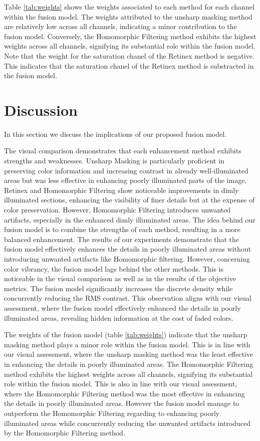 \documentclass[sigconf]{acmart}
\begin{document}
Table \ref{tab:weights} shows the weights associated to each method for each channel within the fusion model. The weights attributed to the unsharp masking method  are relatively low across all channels, indicating a minor contribution to the fusion model. Conversely, the Homomorphic Filtering method exhibits the highest weights across all channels, signifying its substantial role within the fusion model. Note that the  weight for the saturation chanel of the Retinex method is negative. This indicates that the saturation chanel of the Retinex method is substracted in the fusion model. 



\section{Discussion}\label{sec:discussion}
In this section we discuss the implications of our proposed fusion model. 

The visual comparison demonstrates that each enhancement method exhibits strengths and weaknesses. Unsharp Masking is particularly proficient in preserving color information and increasing contrast in already well-illuminated areas but was less effective in enhancing poorly illuminated parts of the image. Retinex and Homomorphic Filtering show noticeable improvements in dimly illuminated sections, enhancing the visibility of finer details but at the expense of color preservation. However, Homomorphic Filtering introduces unwanted artifacts, especially in the enhanced dimly illuminated areas.
The idea behind our fusion model is to combine the strengths of each method, resulting in a more balanced enhancement. The results of our experiments demonstrate that the fusion model effectively enhances the details in poorly illuminated areas without introducing unwanted artifacts like Homomorphic filtering. However, concerning color vibrancy, the fusion model lags behind the other methods. This is noticeable in the visual comparison as well as in the results of the objective metrics. The fusion model significantly increases the discrete density while concurrently reducing the RMS contrast. This observation aligns with our visual assessment, where the fusion model effectively enhanced the details in poorly illuminated areas, revealing hidden information at the cost of faded colors.

The weights of the fusion model (table \ref{tab:weights}) indicate that the unsharp masking method plays a minor role within the fusion model. This is in line with our visual assessment, where the unsharp masking method was the least effective in enhancing the details in poorly illuminated areas. The Homomorphic Filtering method exhibits the highest weights across all channels, signifying its substantial role within the fusion model. This is also in line with our visual assessment, where the Homomorphic Filtering method was the most effective in enhancing the details in poorly illuminated areas. However the fusion model manage to outperform the Homomorphic Filtering regarding to enhancing poorly illuminated areas while concurrently reducing the unwanted artifacts introduced by the Homomorphic Filtering method.
\end{document}

